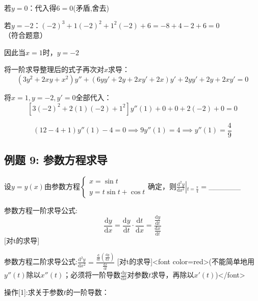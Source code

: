 \documentclass[11pt,a4paper,UTF8]{ctexart}
\begin{document}
\begin{solbox}[分步推导与答题规范]
  若$y=0$：代入得$6=0$(矛盾,舍去)

  若$y=-2$：$(-2)^3 + 1(-2)^2 + 1^2(-2) + 6 = -8 + 4 - 2 + 6 = 0$（符合题意）

  因此当$x=1$时，$y = -2$
\end{solbox}

将一阶求导整理后的式子再次对$x$求导：     
\begin{equation*}
(3y^2 + 2xy + x^2)y'' + (6yy' + 2y + 2xy' + 2x)y' + 2yy' + 2y + 2xy' = 0
\end{equation*}


将$x=1, y=-2, y'=0$全部代入：	 
\begin{equation*}
\left[3(-2)^2 + 2(1)(-2) + 1^2\right] y''(1) + 0 + 0 + 2(-2) + 0 = 0
\end{equation*}




\begin{equation*}
(12 - 4 + 1) y''(1) - 4 = 0 \implies 9y''(1) = 4 \implies y''(1) = \frac{4}{9}
\end{equation*}


\subsection{例题 9: 参数方程求导}

设$y = y(x)$由参数方程$\begin{cases} x = \sin t \\ \\ y = t\sin t + \cos t \end{cases}$确定，则$\left.\frac{\mathrm{d}^2y}{\mathrm{d}x^2}\right\vert{}_{t=\frac{\pi}{4}} =$\_\_\_\_\_\_

参数方程一阶求导公式:
\begin{equation*}
\frac{\mathrm{d}y}{\mathrm{d}x} = \frac{\mathrm{d}y}{\mathrm{d}t} \cdot \frac{\mathrm{d}t}{\mathrm{d}x} = \frac{\frac{\mathrm{d}y}{\mathrm{d}t}}{\frac{\mathrm{d}x}{\mathrm{d}t}}
\end{equation*}
[对t的求导]

参数方程二阶求导公式:$\frac{\mathrm{d}^2y}{\mathrm{d}x^2} = \frac{\frac{\mathrm{d}}{\mathrm{d}t}\left(\frac{\mathrm{d}y}{\mathrm{d}x}\right)}{\frac{\mathrm{d}x}{\mathrm{d}t}}$     [对t的求导]<font color=red>(不能简单地用$y''(t)$除以$x''(t)$；必须将一阶导数$\frac{\mathrm{d}y}{\mathrm{d}x}$对参数$t$求导，再除以$x'(t)$)</font>

操作[1]:求关于参数$t$的一阶导数：
\end{document}
